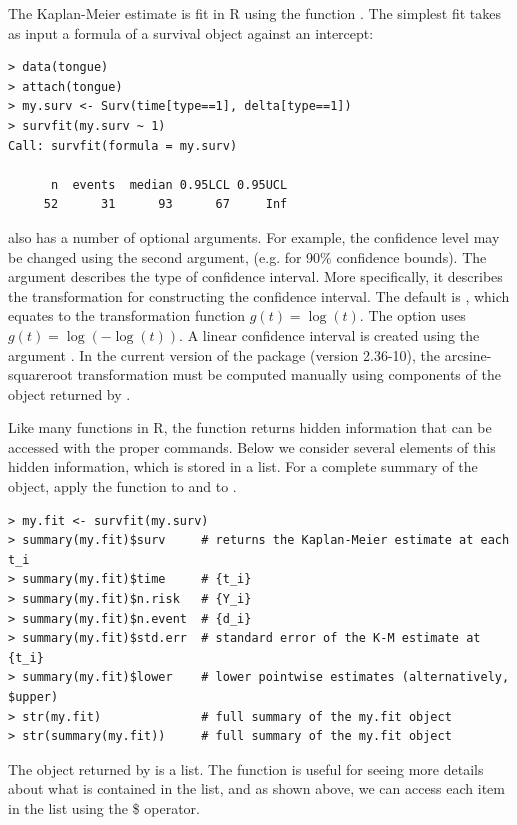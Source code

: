 \documentclass[11pt]{article}
\newcommand{\R}[1]{\textsf{R}}
\begin{document}
The Kaplan-Meier estimate is fit in \R{} using the function . The simplest fit takes as input a formula of a survival object against an intercept:
{\color{verbatimrcom}\begin{verbatim}
> data(tongue)
> attach(tongue)
> my.surv <- Surv(time[type==1], delta[type==1])
> survfit(my.surv ~ 1)
Call: survfit(formula = my.surv)

      n  events  median 0.95LCL 0.95UCL 
     52      31      93      67     Inf 
\end{verbatim}}
 also has a number of optional arguments. For example, the confidence level may be changed using the second argument,  (e.g.  for 90\% confidence bounds). The  argument describes the type of confidence interval. More specifically, it describes the transformation for constructing the confidence interval. The default is , which equates to the transformation function $g(t) = \log(t)$. The  option uses $g(t) = \log(-\log(t))$. A linear confidence interval is created using the argument . In the current version of the  package (version 2.36-10), the arcsine-squareroot transformation must be computed manually using components of the object returned by .

Like many functions in \R{}, the  function returns hidden information that can be accessed with the proper commands. Below we consider several elements of this hidden information, which is stored in a list. For a complete summary of the object, apply the  function to  and to .
{\color{verbatimrcom}\begin{verbatim}
> my.fit <- survfit(my.surv)
> summary(my.fit)$surv     # returns the Kaplan-Meier estimate at each t_i
> summary(my.fit)$time     # {t_i}
> summary(my.fit)$n.risk   # {Y_i}
> summary(my.fit)$n.event  # {d_i}
> summary(my.fit)$std.err  # standard error of the K-M estimate at {t_i}
> summary(my.fit)$lower    # lower pointwise estimates (alternatively, $upper)
> str(my.fit)              # full summary of the my.fit object
> str(summary(my.fit))     # full summary of the my.fit object
\end{verbatim}}
The object returned by  is a list. The  function is useful for seeing more details about what is contained in the list, and as shown above, we can access each item in the list using the \$ operator.
\end{document}
